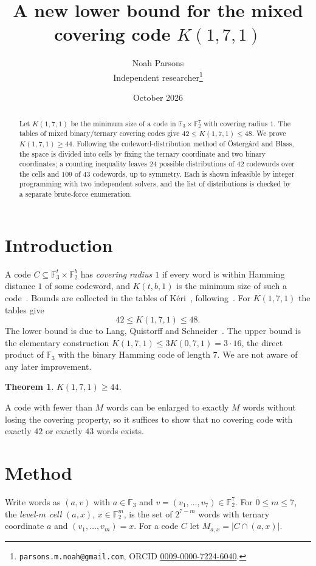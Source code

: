 \documentclass[11pt]{article}
\title{A new lower bound for the mixed covering code $K(1,7,1)$}
\author{Noah Parsons\\ \small Independent researcher\thanks{%
\texttt{parsons.m.noah@gmail.com}, ORCID \href{https://orcid.org/0009-0000-7224-6040}{0009-0000-7224-6040}.}}
\date{October 2026}
\newtheorem{theorem}{Theorem}
\theoremstyle{remark}
\newcommand{\F}{\mathbb{F}}
\begin{document}
\maketitle

\begin{abstract}
Let $K(1,7,1)$ be the minimum size of a code in $\F_3\times\F_2^7$ with covering radius $1$. The
tables of mixed binary/ternary covering codes give $42\le K(1,7,1)\le 48$. We prove
$K(1,7,1)\ge 44$. Following the codeword-distribution method of Östergård and Blass, the space is
divided into cells by fixing the ternary coordinate and two binary coordinates; a counting
inequality leaves $24$ possible distributions of $42$ codewords over the cells and $109$ of $43$
codewords, up to symmetry. Each is shown infeasible by integer programming with two independent
solvers, and the list of distributions is checked by a separate brute-force enumeration.
\end{abstract}

\section{Introduction}

A code $C\subseteq\F_3^t\times\F_2^b$ has \emph{covering radius $1$} if every word is within
Hamming distance $1$ of some codeword, and $K(t,b,1)$ is the minimum size of such a
code~\cite{cohen-book}. Bounds are collected in the tables of K\'eri~\cite{keri},
following~\cite{oh,bow}. For $K(1,7,1)$ the tables give
\[
42\le K(1,7,1)\le 48 .
\]
The lower bound is due to Lang, Quistorff and Schneider~\cite{lqs}. The upper bound is the
elementary construction $K(1,7,1)\le 3K(0,7,1)=3\cdot 16$, the direct product of $\F_3$ with the
binary Hamming code of length $7$. We are not aware of any later improvement.

\begin{theorem}\label{thm:main}
$K(1,7,1)\ge 44$.
\end{theorem}

A code with fewer than $M$ words can be enlarged to exactly $M$ words without losing the covering
property, so it suffices to show that no covering code with exactly $42$ or exactly $43$ words
exists.

\section{Method}

Write words as $(a,v)$ with $a\in\F_3$ and $v=(v_1,\dots,v_7)\in\F_2^7$. For $0\le m\le 7$, the
\emph{level-$m$ cell} $(a,x)$, $x\in\F_2^m$, is the set of $2^{7-m}$ words with ternary
coordinate $a$ and $(v_1,\dots,v_m)=x$. For a code $C$ let $M_{a,x}=|C\cap(a,x)|$.
\end{document}
